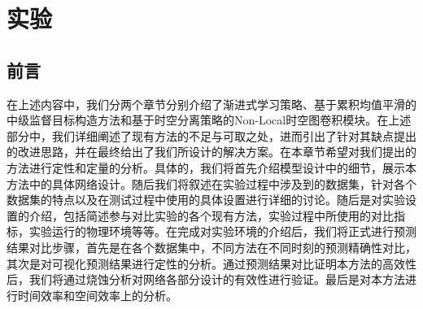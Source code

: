 \chapter{实验}

\section{前言}
在上述内容中，我们分两个章节分别介绍了渐进式学习策略、基于累积均值平滑的中级监督目标构造方法和基于时空分离策略的Non-Local时空图卷积模块。在上述部分中，我们详细阐述了现有方法的不足与可取之处，进而引出了针对其缺点提出的改进思路，并在最终给出了我们所设计的解决方案。在本章节希望对我们提出的方法进行定性和定量的分析。具体的，我们将首先介绍模型设计中的细节，展示本方法中的具体网络设计。随后我们将叙述在实验过程中涉及到的数据集，针对各个数据集的特点以及在测试过程中使用的具体设置进行详细的讨论。随后是对实验设置的介绍，包括简述参与对比实验的各个现有方法，实验过程中所使用的对比指标，实验运行的物理环境等等。在完成对实验环境的介绍后，我们将正式进行预测结果对比步骤，首先是在各个数据集中，不同方法在不同时刻的预测精确性对比，其次是对可视化预测结果进行定性的分析。通过预测结果对比证明本方法的高效性后，我们将通过烧蚀分析对网络各部分设计的有效性进行验证。最后是对本方法进行时间效率和空间效率上的分析。


